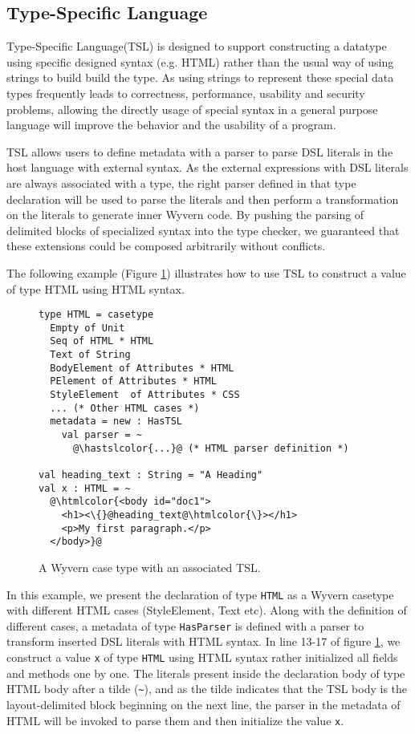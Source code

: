 \documentclass{sig-alternate}
\newcommand{\htmlcolor}[1]{\textcolor[HTML]{339933}{#1}}
\newcommand{\hastslcolor}[1]{\textcolor[HTML]{002FC9}{#1}}
\begin{document}
\subsection{Type-Specific Language}
Type-Specific Language(TSL) is designed to support constructing a datatype using specific designed syntax (e.g. HTML) rather than the usual way of using strings to build build the type. As using strings to represent these special data types frequently leads to correctness, performance, usability and security problems, allowing the directly usage of special syntax in a general purpose language will improve the behavior and the usability of a program.
\par
TSL allows users to define metadata with a parser to parse DSL literals in the host language with external syntax. As the external expressions with DSL literals are always associated with a type, the right parser defined in that type declaration will be used to parse the literals and then perform a transformation on the literals to generate inner Wyvern code. By pushing the parsing of delimited blocks of specialized syntax into the type checker, we guaranteed that these extensions could be composed arbitrarily without conflicts.
\par
The following example (Figure \ref{f-htmltype}) illustrates how to use TSL to construct a value of type HTML using HTML syntax.

\begin{figure}[ht!]
\begin{lstlisting}[style=wyvern]
type HTML = casetype 
  Empty of Unit
  Seq of HTML * HTML 
  Text of String
  BodyElement of Attributes * HTML
  PElement of Attributes * HTML
  StyleElement  of Attributes * CSS
  ... (* Other HTML cases *)
  metadata = new : HasTSL
    val parser = ~
      @\hastslcolor{...}@ (* HTML parser definition *)

val heading_text : String = "A Heading"
val x : HTML = ~
  @\htmlcolor{<body id="doc1">
    <h1><\{}@heading_text@\htmlcolor{\}></h1>
    <p>My first paragraph.</p>
  </body>}@
\end{lstlisting}
\caption{A Wyvern case type with an associated TSL. }
\label{f-htmltype}
\end{figure}

In this example, we present the declaration of type \verb|HTML| as a Wyvern casetype with different HTML cases (StyleElement, Text etc). Along with the definition of different cases, a metadata of type \verb|HasParser| is defined with a parser to transform inserted DSL literals with HTML syntax. In line 13-17 of figure \ref{f-htmltype}, we construct a value \verb|x| of type \verb|HTML| using HTML syntax rather initialized all fields and methods one by one. The literals present inside the declaration body of type HTML body after a tilde (\verb|~|), and as the tilde indicates that the TSL body is the layout-delimited block beginning on the next line, the parser in the metadata of HTML will be invoked to parse them and then initialize the value \verb|x|.
\end{document}
